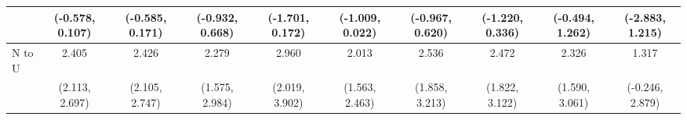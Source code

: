 {\begin{tabular}{l|c|c|c|c|c|c|c|c|c}
& {\scriptsize (-0.578, 0.107)}
& {\scriptsize (-0.585, 0.171)}
& {\scriptsize (-0.932, 0.668)}
& {\scriptsize (-1.701, 0.172)}
& {\scriptsize (-1.009, 0.022)}
& {\scriptsize (-0.967, 0.620)}
& {\scriptsize (-1.220, 0.336)}
& {\scriptsize (-0.494, 1.262)}
& {\scriptsize (-2.883, 1.215)}
\\ [0.1cm]
\hline
N to U
& 2.405 & 2.426 & 2.279 & 2.960 & 2.013 & 2.536 & 2.472 & 2.326 & 1.317 \\
& {\scriptsize (2.113, 2.697)}
& {\scriptsize (2.105, 2.747)}
& {\scriptsize (1.575, 2.984)}
& {\scriptsize (2.019, 3.902)}
& {\scriptsize (1.563, 2.463)}
& {\scriptsize (1.858, 3.213)}
& {\scriptsize (1.822, 3.122)}
& {\scriptsize (1.590, 3.061)}
& {\scriptsize (-0.246, 2.879)}
\\ [0.1cm]
\hline
\hline
\end{tabular}
}
